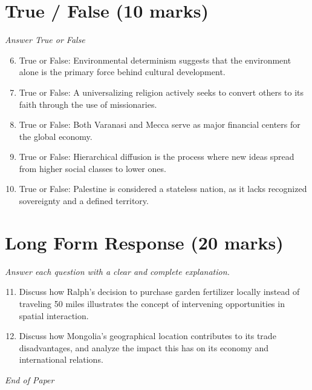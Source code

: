 \documentclass[12pt]{article}
\begin{document}
\section*{True / False (10 marks)}
\textit{Answer True or False}
\begin{enumerate}[label=\arabic*.]
\setcounter{enumi}{5}
\item True or False: Environmental determinism suggests that the environment alone is the primary force behind cultural development.
\item True or False: A universalizing religion actively seeks to convert others to its faith through the use of missionaries.
\item True or False: Both Varanasi and Mecca serve as major financial centers for the global economy.
\item True or False: Hierarchical diffusion is the process where new ideas spread from higher social classes to lower ones.
\item True or False: Palestine is considered a stateless nation, as it lacks recognized sovereignty and a defined territory.
\end{enumerate}

\section*{Long Form Response (20 marks)}
\textit{Answer each question with a clear and complete explanation.}
\begin{enumerate}[label=\arabic*.]
\setcounter{enumi}{10}
\item Discuss how Ralph's decision to purchase garden fertilizer locally instead of traveling 50 miles illustrates the concept of intervening opportunities in spatial interaction.
\item Discuss how Mongolia's geographical location contributes to its trade disadvantages, and analyze the impact this has on its economy and international relations.
\end{enumerate}

\vfill
\noindent\textit{End of Paper}
\end{document}
